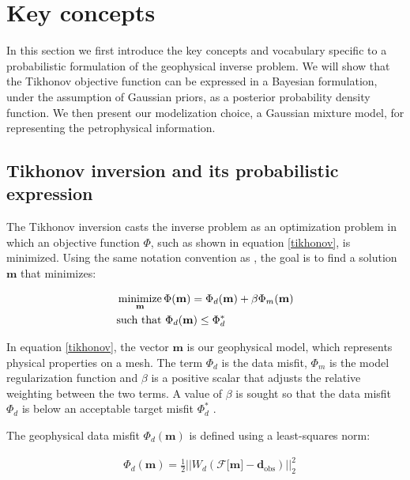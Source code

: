 \documentclass[extra]{gji} %
\begin{document}
\section{Key concepts} \label{section:keys}

In this section we first introduce the key concepts and vocabulary specific to a probabilistic formulation of the geophysical inverse problem. We will show that the Tikhonov objective function can be expressed in a Bayesian formulation, under the assumption of Gaussian priors, as a posterior probability density function. We then present our modelization choice, a Gaussian mixture model, for representing the petrophysical information.


\subsection{Tikhonov inversion and its probabilistic expression} \label{section:tik}

The Tikhonov inversion \citep{tikhonov1977solutions} casts the inverse problem as an optimization problem in which an objective function $\Phi$, such as shown in equation \ref{tikhonov}, is minimized. Using the same notation convention as \cite{doi:10.1190/1.9781560801719.ch5}, the goal is to find a solution $\mathbf{m}$ that minimizes:

\begin{align}
\begin{split}
&\mathop{\hbox{minimize}}\limits_{\mathbf{m}}\Phi(\mathbf{m}) = \Phi_d(\mathbf{m}) + \beta \Phi_m(\mathbf{m}) \label{tikhonov} \\
&\text{such that } \Phi_d(\mathbf{m}) \leq \Phi_d^*
\end{split}
\end{align}

In equation \ref{tikhonov}, the vector $\mathbf{m}$ is our geophysical model, which represents physical properties on a mesh. The term $\Phi_d$ is the data misfit, $\Phi_m$ is the model regularization function and $\beta$ is a positive scalar that adjusts the relative weighting between the two terms. A value of $\beta$ is sought so that the data misfit $\Phi_d$ is below an acceptable target misfit $\Phi_d^*$ \citep{Parker}.

The geophysical data misfit $\Phi_d(\mathbf{m})$ is defined using a least-squares norm:

\begin{align}
&\Phi_d(\mathbf{m}) = \frac{1}{2}||W_d(\mathcal{F}\lbrack\mathbf{m}\rbrack-\mathbf{d}_{\text{obs}})||^2_2 \label{datamisfit}
\end{align}
\end{document}
